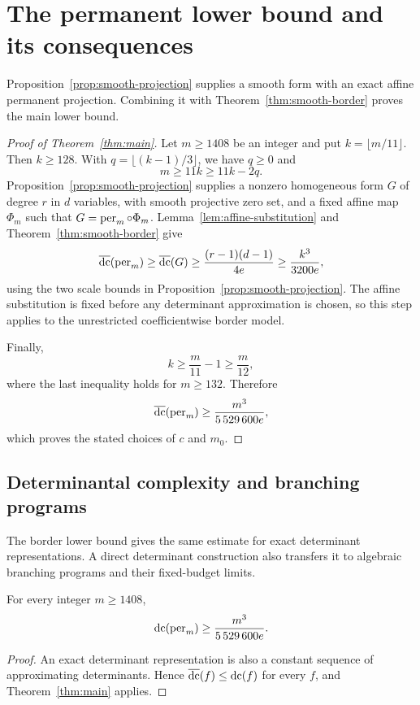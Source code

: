 \section{The permanent lower bound and its consequences}
\label{sec:consequences}

Proposition~\ref{prop:smooth-projection} supplies a smooth form with an
exact affine permanent projection. Combining it with
Theorem~\ref{thm:smooth-border} proves the main lower bound.

\begin{proof}[Proof of Theorem~\ref{thm:main}]
Let \(m\ge1408\) be an integer and put \(k=\lfloor m/11\rfloor\).
Then \(k\ge128\).  With \(q=\lfloor(k-1)/3\rfloor\), we have
\(q\ge0\) and
\[
 m\ge11k\ge11k-2q.
\]
Proposition~\ref{prop:smooth-projection} supplies a nonzero homogeneous
form \(G\) of degree \(r\) in \(d\) variables, with smooth projective
zero set, and a fixed affine map \(\Phi_m\) such that
\(G=\operatorname{per}_m\circ\Phi_m\).  Lemma~\ref{lem:affine-substitution} and
Theorem~\ref{thm:smooth-border} give
\[
 \operatorname{\overline{dc}}(\operatorname{per}_m)\ge\operatorname{\overline{dc}}(G)
 \ge\frac{(r-1)(d-1)}{4e}
 \ge\frac{k^3}{3200e},
\]
using the two scale bounds in Proposition~\ref{prop:smooth-projection}.
The affine substitution is fixed before any determinant approximation
is chosen, so this step applies to the unrestricted coefficientwise
border model.

Finally,
\[
 k\ge\frac{m}{11}-1\ge\frac{m}{12},
\]
where the last inequality holds for \(m\ge132\).  Therefore
\[
 \operatorname{\overline{dc}}(\operatorname{per}_m)\ge\frac{m^3}{5\,529\,600e},
\]
which proves the stated choices of \(c\) and \(m_0\).
\end{proof}

\subsection{Determinantal complexity and branching programs}

The border lower bound gives the same estimate for exact determinant
representations. A direct determinant construction also transfers it to
algebraic branching programs and their fixed-budget limits.

\begin{corollary}
\label{cor:exact-complexity}
For every integer $m\ge1408$,
\[
 \operatorname{dc}(\operatorname{per}_m)\ge \frac{m^3}{5\,529\,600e}.
\]
\end{corollary}
\begin{proof}
An exact determinant representation is also a constant sequence of
approximating determinants. Hence $\operatorname{\overline{dc}}(f)\le\operatorname{dc}(f)$ for every $f$, and
Theorem~\ref{thm:main} applies.
\end{proof}

